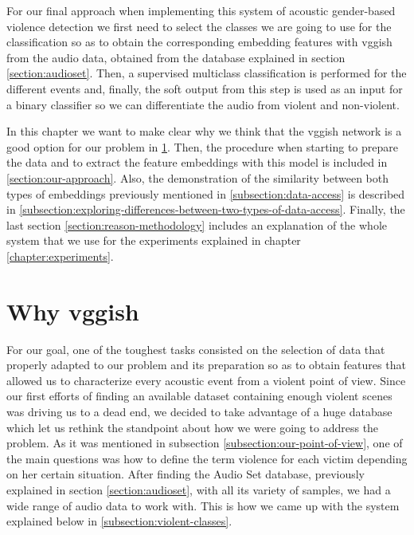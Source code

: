 
	\label{chapter:our-approach-for-avd}
	
	For our final approach when implementing this system of acoustic gender-based violence detection we first need to select the classes we are going to use for the classification so as to obtain the corresponding embedding features with \acrshort{vgg}ish from the audio data, obtained from the database explained in section \ref{section:audioset}. Then, a supervised multiclass classification is performed for the different events and, finally, the soft output from this step is used as an input for a binary classifier so we can differentiate the audio from violent and non-violent.
	
	In this chapter we want to make clear why we think that the \acrshort{vgg}ish network is a good option for our problem in \ref{section:why-vggish}. Then, the procedure when starting to prepare the data and to extract the feature embeddings with this model is included in \ref{section:our-approach}. Also, the demonstration of the similarity between both types of embeddings previously mentioned in \ref{subsection:data-access} is described in \ref{subsection:exploring-differences-between-two-types-of-data-access}. Finally, the last section \ref{section:reason-methodology} includes an explanation of the whole system that we use for the experiments explained in chapter \ref{chapter:experiments}.

\section{Why \acrshort{vgg}ish}
\label{section:why-vggish}

	For our goal, one of the toughest tasks consisted on the selection of data that properly adapted to our problem and its preparation so as to obtain features that allowed us to characterize every acoustic event from a violent point of view. Since our first efforts of finding an available dataset containing enough violent scenes was driving us to a dead end, we decided to take advantage of a huge database which let us rethink the standpoint about how we were going to address the problem. As it was mentioned in subsection \ref{subsection:our-point-of-view}, one of the main questions was how to define the term violence for each victim depending on  her certain situation. After finding the Audio Set database, previously explained in section \ref{section:audioset}, with all its variety of samples, we had a wide range of audio data to work with. This is how we came up with the system explained below in \ref{subsection:violent-classes}.

